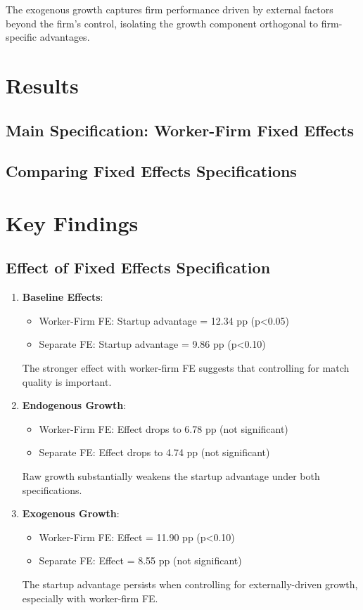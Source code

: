 \documentclass[11pt]{article}
\begin{document}
The exogenous growth captures firm performance driven by external factors beyond the firm's control, isolating the growth component orthogonal to firm-specific advantages.

\section{Results}

\subsection{Main Specification: Worker-Firm Fixed Effects}



\subsection{Comparing Fixed Effects Specifications}



\section{Key Findings}

\subsection{Effect of Fixed Effects Specification}

\begin{enumerate}
\item \textbf{Baseline Effects}: 
   \begin{itemize}
   \item Worker-Firm FE: Startup advantage = 12.34 pp (p<0.05)
   \item Separate FE: Startup advantage = 9.86 pp (p<0.10)
   \end{itemize}
   The stronger effect with worker-firm FE suggests that controlling for match quality is important.

\item \textbf{Endogenous Growth}: 
   \begin{itemize}
   \item Worker-Firm FE: Effect drops to 6.78 pp (not significant)
   \item Separate FE: Effect drops to 4.74 pp (not significant)
   \end{itemize}
   Raw growth substantially weakens the startup advantage under both specifications.

\item \textbf{Exogenous Growth}: 
   \begin{itemize}
   \item Worker-Firm FE: Effect = 11.90 pp (p<0.10)
   \item Separate FE: Effect = 8.55 pp (not significant)
   \end{itemize}
   The startup advantage persists when controlling for externally-driven growth, especially with worker-firm FE.
\end{enumerate}
\end{document}
